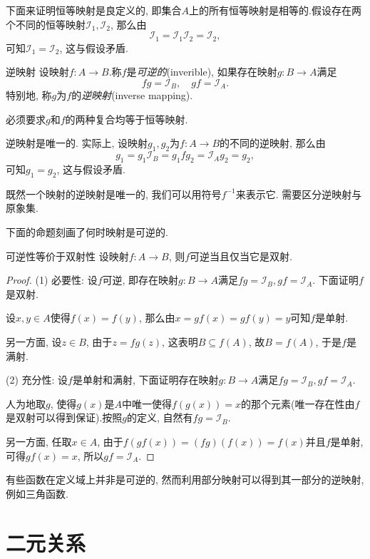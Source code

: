 下面来证明恒等映射是良定义的, 即集合$A$上的所有恒等映射是相等的.假设存在两个不同的恒等映射$\mathcal{I}_1, \mathcal{I}_2$, 那么由$$\mathcal{I}_1 = \mathcal{I}_1 \mathcal{I}_2 = \mathcal{I}_2, $$
可知$\mathcal{I}_1 = \mathcal{I}_2$, 这与假设矛盾.

\begin{definition}{逆映射}
	设映射$f: A \to B$.称$f$是\textit{可逆的}(inverible), 如果存在映射$g: B \to A$满足$$fg=\mathcal{I}_B, \quad gf=\mathcal{I}_A.$$
	特别地, 称$g$为$f$的\textit{逆映射}(inverse mapping).
\end{definition}
\begin{remark}
	必须要求$g$和$f$的两种复合均等于恒等映射. 
\end{remark}

逆映射是唯一的. 实际上, 设映射$g_1, g_2$为$f: A \to B$的不同的逆映射, 那么由$$g_1 = g_1\mathcal{I}_B = g_1fg_2 = \mathcal{I}_Ag_2 = g_2, $$
可知$g_1=g_2$, 这与假设矛盾.

既然一个映射的逆映射是唯一的, 我们可以用符号$f^{-1}$来表示它. 需要区分逆映射与原象集.

下面的命题刻画了何时映射是可逆的.

\begin{proposition}{可逆性等价于双射性}
	设映射$f: A \to B$, 则$f$可逆当且仅当它是双射.
\end{proposition}
\begin{proof}
	(1) 必要性: 设$f$可逆, 即存在映射$g: B \to A$满足$fg=\mathcal{I}_B, gf=\mathcal{I}_A$. 下面证明$f$是双射. 
	
	设$x, y \in A$使得$f(x)=f(y)$, 那么由$x=gf(x)=gf(y)=y$可知$f$是单射. 
	
	另一方面, 设$z \in B$, 由于$z=fg(z)$, 这表明$B \subseteq f(A)$, 故$B = f(A)$, 于是$f$是满射. 
	
	(2) 充分性: 设$f$是单射和满射, 下面证明存在映射$g: B \to A$满足$fg=\mathcal{I}_B, gf=\mathcal{I}_A$. 
	
	人为地取$g$, 使得$g(x)$是$A$中唯一使得$f(g(x))=x$的那个元素(唯一存在性由$f$是双射可以得到保证).按照$g$的定义, 自然有$fg=\mathcal{I}_B$. 
	
	另一方面, 任取$x \in A$, 由于$f(gf(x)) = (fg)(f(x)) = f(x)$并且$f$是单射, 可得$gf(x)=x$, 所以$gf=\mathcal{I}_A$.
\end{proof}

有些函数在定义域上并非是可逆的, 然而利用部分映射可以得到其一部分的逆映射, 例如三角函数.

\newpage
\section{二元关系}

